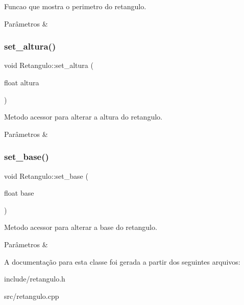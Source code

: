 Funcao que mostra o perimetro do retangulo. 


\begin{DoxyParams}{Parâmetros}
{\em } & \\
\hline
\end{DoxyParams}
\mbox{\label{classRetangulo_aec26d23f64842a87d2084ec402d6e82c}} 
\subsubsection{\texorpdfstring{set\+\_\+altura()}{set\_altura()}}
{\footnotesize\ttfamily void Retangulo\+::set\+\_\+altura (\begin{DoxyParamCaption}\item[{float}]{altura }\end{DoxyParamCaption})}



Metodo acessor para alterar a altura do retangulo. 


\begin{DoxyParams}{Parâmetros}
{\em } & \\
\hline
\end{DoxyParams}
\mbox{\label{classRetangulo_a7f9b99e4100e568e0f78850917dbb87e}} 
\subsubsection{\texorpdfstring{set\+\_\+base()}{set\_base()}}
{\footnotesize\ttfamily void Retangulo\+::set\+\_\+base (\begin{DoxyParamCaption}\item[{float}]{base }\end{DoxyParamCaption})}



Metodo acessor para alterar a base do retangulo. 


\begin{DoxyParams}{Parâmetros}
{\em } & \\
\hline
\end{DoxyParams}


A documentação para esta classe foi gerada a partir dos seguintes arquivos\+:\begin{DoxyCompactItemize}
\item 
include/retangulo.\+h\item 
src/retangulo.\+cpp\end{DoxyCompactItemize}

